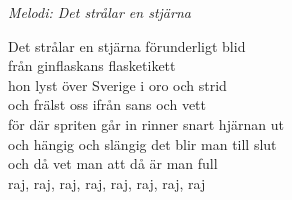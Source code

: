 {\footnotesize\textit{Melodi: Det strålar en stjärna}}\par
\vspace{10pt}
Det strålar en stjärna förunderligt blid\\
från ginflaskans flasketikett\\
hon lyst över Sverige i oro och strid\\
och frälst oss ifrån sans och vett\\
för där spriten går in rinner snart hjärnan ut\\
och hängig och slängig det blir man till slut\\
och då vet man att då är man full\\
raj, raj, raj, raj, raj, raj, raj, raj
